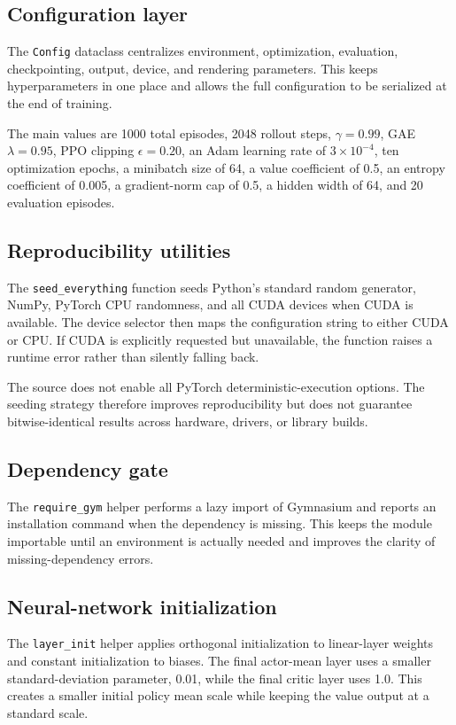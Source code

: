 \documentclass[11pt,a4paper]{article}
\begin{document}
\subsection{Configuration layer}
The \texttt{Config} dataclass centralizes environment, optimization, evaluation, checkpointing, output, device, and rendering parameters. This keeps hyperparameters in one place and allows the full configuration to be serialized at the end of training.

The main values are 1000 total episodes, 2048 rollout steps, $\gamma=0.99$, GAE $\lambda=0.95$, PPO clipping $\epsilon=0.20$, an Adam learning rate of $3\times10^{-4}$, ten optimization epochs, a minibatch size of 64, a value coefficient of 0.5, an entropy coefficient of 0.005, a gradient-norm cap of 0.5, a hidden width of 64, and 20 evaluation episodes.

\subsection{Reproducibility utilities}
The \texttt{seed\_everything} function seeds Python's standard random generator, NumPy, PyTorch CPU randomness, and all CUDA devices when CUDA is available. The device selector then maps the configuration string to either CUDA or CPU. If CUDA is explicitly requested but unavailable, the function raises a runtime error rather than silently falling back.

The source does not enable all PyTorch deterministic-execution options. The seeding strategy therefore improves reproducibility but does not guarantee bitwise-identical results across hardware, drivers, or library builds.

\subsection{Dependency gate}
The \texttt{require\_gym} helper performs a lazy import of Gymnasium and reports an installation command when the dependency is missing. This keeps the module importable until an environment is actually needed and improves the clarity of missing-dependency errors.

\subsection{Neural-network initialization}
The \texttt{layer\_init} helper applies orthogonal initialization to linear-layer weights and constant initialization to biases. The final actor-mean layer uses a smaller standard-deviation parameter, 0.01, while the final critic layer uses 1.0. This creates a smaller initial policy mean scale while keeping the value output at a standard scale.
\end{document}
